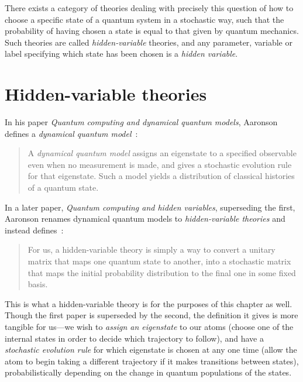 There exists a category of theories dealing with precisely this question of how to choose a specific state of a quantum system in a stochastic way, such that the probability of having chosen a state is equal to that given by quantum mechanics. Such theories are called \emph{hidden-variable} theories, and any parameter, variable or label specifying which state has been chosen is a \emph{hidden variable}.

\section{Hidden-variable theories}\label{sec:hidden_variable_theories}

In his paper \emph{Quantum computing and dynamical quantum models}, Aaronson defines a \emph{dynamical quantum model}~\cite{aaronson_quantum_2002}:

\begin{quote}
A \emph{dynamical quantum model} assigns an eigenstate to a specified observable even when no measurement is made, and gives a stochastic evolution rule for that eigenstate. Such a model yields a distribution of classical histories of a quantum state.
\end{quote}
In a later paper, \emph{Quantum computing and hidden variables}, superseding the first, Aaronson renames dynamical quantum models to \emph{hidden-variable theories} and instead defines~\cite{PhysRevA.71.032325}:
\begin{quote}
For us, a hidden-variable theory is simply a way to convert a unitary matrix that maps one quantum state to another, into a stochastic matrix that maps the initial probability distribution to the final one in some fixed basis.
\end{quote}
This is what a hidden-variable theory is for the purposes of this chapter as well. Though the first paper is superseded by the second, the definition it gives is more tangible for us---we wish to \emph{assign an eigenstate} to our atoms (choose one of the internal states in order to decide which trajectory to follow), and have a \emph{stochastic evolution rule} for which eigenstate is chosen at any one time (allow the atom to begin taking a different trajectory if it makes transitions between states), probabilistically depending on the change in quantum populations of the states.

